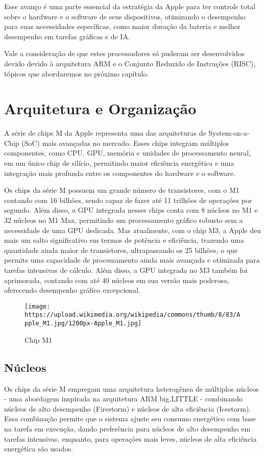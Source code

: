 \documentclass[a4paper,times,12pt]{article}
\begin{document}
Esse avanço é uma parte essencial da estratégia da Apple para ter controle total sobre o hardware e o software de seus dispositivos, otimizando o desempenho para suas necessidades específicas, como maior duração da bateria e melhor desempenho em tarefas gráficas e de IA. 

Vale a consideração de que estes processadores só puderam ser desenvolvidos devido devido à arquitetura ARM e o Conjunto Reduzido de Instruções (RISC), tópicos que abordaremos no próximo capítulo.

\section{Arquitetura e Organização}

\hspace*{+15pt} A série de chips M da Apple representa uma das arquiteturas de System-on-a-Chip (SoC) mais avançadas no mercado. Esses chips integram múltiplos componentes, como CPU, GPU, memória e unidades de processamento neural, em um único chip de silício, permitindo maior eficiência energética e uma integração mais profunda entre os componentes do hardware e o software.

Os chips da série M possuem um grande número de transistores, com o M1 contando com 16 bilhões, sendo capaz de fazer até 11 trilhões de operações por segundo. Além disso, a GPU integrada nesses chips conta com 8 núcleos no M1 e 32 núcleos no M1 Max, permitindo um processamento gráfico robusto sem a necessidade de uma GPU dedicada. Mas atualmente, com o chip M3, a Apple deu mais um salto significativo em termos de potência e eficiência, trazendo uma quantidade ainda maior de transistores, ultrapassando os 25 bilhões, o que permite uma capacidade de processamento ainda mais avançada e otimizada para tarefas intensivas de cálculo. Além disso, a GPU integrada no M3 também foi aprimorada, contando com até 40 núcleos em sua versão mais poderosa, oferecendo desempenho gráfico excepcional.

\begin{figure}[h]
    \centering
    \texttt{[image: https://upload.wikimedia.org/wikipedia/commons/thumb/8/83/Apple\_M1.jpg/1200px-Apple\_M1.jpg]}
    \caption{Chip M1}
    \label{fig:apple_m1}
\end{figure}

\subsection{Núcleos}
Os chips da série M empregam uma arquitetura heterogênea de múltiplos núcleos - uma abordagem inspirada na arquitetura ARM big.LITTLE - combinando núcleos de alto desempenho (Firestorm) e núcleos de alta eficiência (Icestorm). Essa combinação permite que o sistema ajuste seu consumo energético com base na tarefa em execução, dando preferência para núcleos de alto desempenho em tarefas intensivas, enquanto, para operações mais leves, núcleos de alta eficiência energética são usados.
\end{document}
